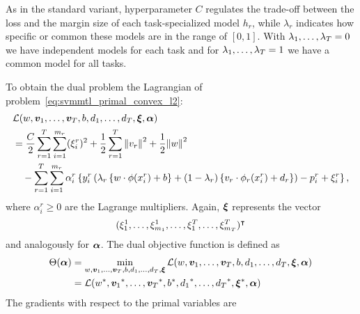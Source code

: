As in the standard variant, hyperparameter $C$ regulates the trade-off between the loss and the margin size of each task-specialized model $h_r$, while $\lambda_r$ indicates how specific or common these models are in the range of $[0, 1]$. With $\lambda_1, \ldots, \lambda_T=0$ we have independent models for each task and for $\lambda_1, \ldots, \lambda_T=1$ we have a common model for all tasks. 
 


 To obtain the dual problem the Lagrangian of problem~\eqref{eq:svmmtl_primal_convex_l2}:
\begin{equation}\label{eq:svmmtl_lagrangian_convex_l2}
    \begin{aligned}
        & \lagr({w}, \fv{v}_1, \ldots, \fv{v}_\ntasks, b, d_1, \ldots, d_\ntasks, \fv{\xi}, \fv{\alpha}) \\
        &=  \frac{C}{2} \sum_{r= 1}^T \sum_{i=1}^{m_r} ({\xi_{i}^r})^2 + \frac{1}{2} \sum_{r= 1}^T{\norm{{v}_r}^2} + \frac{1}{2} {\norm{{w}}}^2 \\
        &\quad -  \sum_{r= 1}^T \sum_{i=1}^{m_r} \alpha_i^r \left\lbrace y_{i}^r  \left(\lambda_r \left\lbrace {w} \cdot \phi(x_{i}^r) + b  \right\rbrace + (1 - \lambda_r) \left\lbrace {v}_r \cdot \phi_r(x_{i}^r) + d_r \right\rbrace  \right) - p_{i}^r + \xi_{i}^r  \right\rbrace ,
    \end{aligned}
\end{equation}
where $\alpha_i^r \geq 0$ are the Lagrange multipliers. Again, $\bm{\xi}$ represents the vector $$(\xi_1^1, \ldots, \xi_{m_1}^1, \ldots, \xi_1^T, \ldots, \xi_{m_T}^T)^\intercal$$ and analogously for $\bm{\alpha}$. The dual objective function is defined as 
\begin{equation}\nonumber
    \begin{aligned}
         \Theta(\bm{\alpha}) &=  \min_{{w}, \bm{v}_1, \ldots, \bm{v}_T, b, d_1, \ldots, d_T, \bm{\xi}} \mathcal{L}({w}, \bm{v}_1, \ldots, \bm{v}_T, b, d_1, \ldots, d_T, \bm{\xi}, \bm{\alpha}) \\
         &= \mathcal{L}({{w}}^*, {\bm{v}_1}^*, \ldots, {\bm{v}_T}^*, {b}^*, {d_1}^*, \ldots, {d_T}^*, {\bm{\xi}}^*, \bm{\alpha})
    \end{aligned}    
\end{equation}
The gradients with respect to the primal variables are
